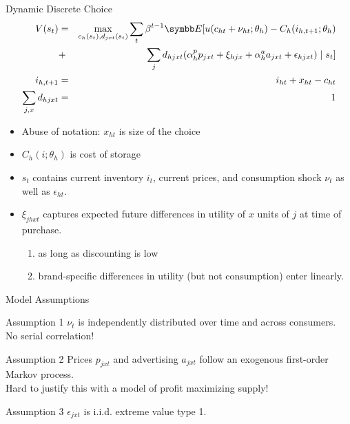 \documentclass[aspectratio=169,11pt]{beamer}
\begin{document}
\begin{frame}{Dynamic Discrete Choice}
\footnotesize
\begin{eqnarray*}
V(s_t)&=& \max_{c_h(s_t),d_{jxt}(s_t)} \sum_t \beta^{t-1} \E[ u(c_{ht}+\nu_{ht}; \theta_h) - C_h(i_{h,t+1};\theta_h) \\
&+&\sum_j d_{hjxt} (\alpha_h^p p_{jxt} + \xi_{hjx} + \alpha_h^a a_{jxt} + \epsilon_{hjxt} ) \mid  s_t]\\
i_{h,t+1} &=& i_{ht} + x_{ht} - c_{ht}\\
\sum_{j,x} d_{hjxt} &=& 1
\end{eqnarray*}
\begin{itemize}
\item Abuse of notation: $x_{ht}$ is size of the choice
\item $C_h(i; \theta_h)$ is cost of storage
\item $s_t$ contains current inventory $i_t$, current prices, and consumption shock $\nu_t$ as well as $\epsilon_{ht}$.
\item $\xi_{jhxt}$ captures expected future differences in utility of $x$ units of $j$ at time of purchase.
\begin{enumerate}
\item as long as discounting is low
\item brand-specific differences in utility (but not consumption) enter linearly.
\end{enumerate}
\end{itemize}
\end{frame}

\begin{frame}{Model Assumptions}
\begin{block}{Assumption 1}
$\nu_t$ is independently distributed over time and across consumers.\\
 \alert{No serial correlation!}
\end{block}
\begin{block}{Assumption 2}
Prices $p_{jxt}$ and advertising $a_{jxt}$ follow an exogenous first-order Markov process.\\
\alert{Hard to justify this with a model of profit maximizing supply!}
\end{block}
\begin{block}{Assumption 3}
$\epsilon_{jxt}$ is i.i.d. extreme value type 1.
\end{block}
\end{frame}
\end{document}
